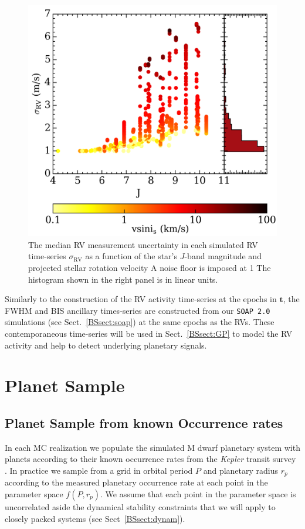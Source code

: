 \begin{figure}
  \centering
  \includegraphics[width=0.6\hsize]{figures/sigmaRV.png}%
  \caption[RV measurement uncertainty versus $J$-band magnitude and ]
      {\small The median RV measurement uncertainty in each simulated RV time-series $\sigma_{\text{RV}}$
    as a function of the star's $J$-band magnitude and projected stellar rotation velocity  A noise floor is
    imposed at 1  The histogram shown in the right panel is in linear units.}
  \label{BSfig:sigmaRV}
\end{figure}

Similarly to the construction of the RV activity time-series at the epochs in $\mathbf{t}$, the FWHM and BIS
ancillary times-series are constructed from our \texttt{SOAP 2.0} simulations (see Sect.~\ref{BSsect:soap}) 
at the same epochs as the RVs. These contemporaneous time-series will be used in Sect.~\ref{BSsect:GP} to
model the RV activity and help to detect underlying planetary signals.


\section{Planet Sample} \label{BSsect:planetsample}
\subsection{Planet Sample from known Occurrence rates}
In each MC realization we populate the simulated M dwarf planetary system with planets according to
their known occurrence rates from the \emph{Kepler} transit survey \citep{dressing15a}. In practice
we sample from a grid in orbital period $P$ and planetary radius $r_p$
according to the measured planetary occurrence rate at each point in the parameter space $f(P,r_p)$.
We assume that each point in the parameter space is
uncorrelated aside the dynamical stability constraints that we will apply to closely packed systems 
(see Sect~\ref{BSsect:dynam}).


